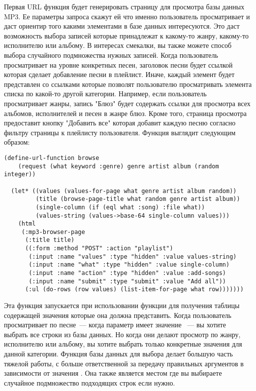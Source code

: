Первая URL функция будет генерировать страницу для просмотра базы данных MP3. Ее параметры
запроса скажут ей что именно пользователь просматривает и даст ориентир того какими
элементами в базе данных интересуются. Это даст возможность выбора записей которые
принадлежат к какому-то жанру, какому-то исполнителю или альбому. В интересах смекалки, вы
также можете способ выбора случайного подмножества нужных записей. Когда пользователь
просматривает на уровне конкретных песен, заголовок песни будет ссылкой которая сделает
добавление песни в плейлист. Иначе, каждый элемент будет представлен со ссылками которые
позволят пользователю просматривать элемента списка по какой-то другой категории.
Например, если пользователь просматривает жанры, запись "Блюз" будет содержать ссылки для
просмотра всех альбомов, исполнителей и песен в жанре блюз. Кроме того, страница просмотра
предоставит кнопку "Добавить все" которая добавит каждую песню согласно фильтру страницы к
плейлисту пользователя. Функция выглядит следующим образом:

\begin{lstlisting}
(define-url-function browse
    (request (what keyword :genre) genre artist album (random integer))

  (let* ((values (values-for-page what genre artist album random))
         (title (browse-page-title what random genre artist album))
         (single-column (if (eql what :song) :file what))
         (values-string (values->base-64 single-column values)))
    (html
     (:mp3-browser-page
      (:title title)
      ((:form :method "POST" :action "playlist")
       (:input :name "values" :type "hidden" :value values-string)
       (:input :name "what" :type "hidden" :value single-column)
       (:input :name "action" :type "hidden" :value :add-songs)
       (:input :name "submit" :type "submit" :value "Add all"))
      (:ul (do-rows (row values) (list-item-for-page what row)))))))
\end{lstlisting}

Эта функция запускается при использовании функции  для получения
таблицы содержащей значения которые она должна представить. Когда пользователь
просматривает по песне~--- когда параметр  имеет значение ~--- вы
хотите выбрать все строки из базы данных. Но когда они делают просмотр по жанру,
исполнителю или альбому, вы хотите выбрать только конкретные значения для данной
категории. Функция базы данных для выбора делает большую часть тяжелой работы, с
 больше ответственной за передачу правильных аргументов в
зависимости от значения . Она также является местом где вы выбираете случайное
подмножество подходящих строк если нужно.

